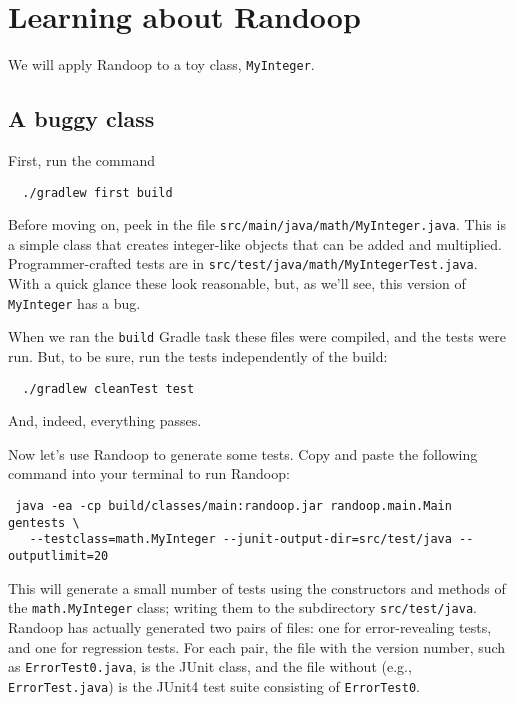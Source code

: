 \documentclass[11pt, oneside]{article} %
\newcommand{\code}[1]{{\texttt{#1}}}
\newcommand{\cmd}[1]{{\texttt{#1}}}
\begin{document}
\section{Learning about Randoop}\label{thebasics}
We will apply Randoop to a toy class, \texttt{MyInteger}.

\subsection{A buggy class}
First, run the command
\begin{verbatim}
  ./gradlew first build
\end{verbatim}

Before moving on, peek in the file \texttt{src/main/java/math/MyInteger.java}.
This is a simple class that creates integer-like objects that can be added and multiplied.
Programmer-crafted tests are in \texttt{src/test/java/math/MyIntegerTest.java}.
With a quick glance these look reasonable, but, as we'll see, this version of \code{MyInteger} has a bug.

When we ran the \cmd{build} Gradle task these files were compiled, and the tests were run.
But, to be sure, run the tests independently of the build:
\begin{verbatim}
  ./gradlew cleanTest test
\end{verbatim}
And, indeed, everything passes.

Now let's use Randoop to generate some tests.
Copy and paste the following command into your terminal to run Randoop:
\begin{verbatim}
 java -ea -cp build/classes/main:randoop.jar randoop.main.Main gentests \
   --testclass=math.MyInteger --junit-output-dir=src/test/java --outputlimit=20
\end{verbatim}
This will generate a small number of tests using the constructors and methods of the \texttt{math.MyInteger} class; writing them to the subdirectory \texttt{src/test/java}.
Randoop has actually generated two pairs of files: one for error-revealing tests, and one for regression tests.
For each pair, the file with the version number, such as \texttt{ErrorTest0.java}, is the JUnit class, and the file without (e.g., \texttt{ErrorTest.java}) is the JUnit4 test suite consisting of \code{ErrorTest0}.
\end{document}
